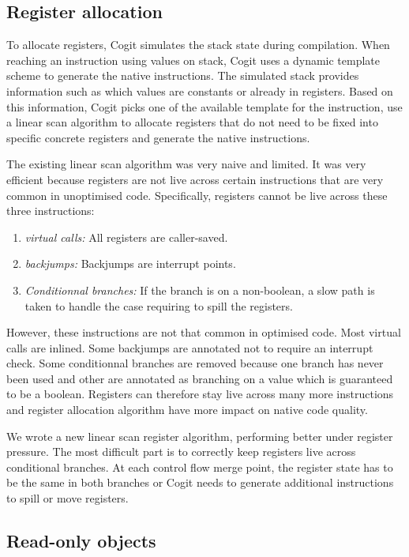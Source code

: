 \documentclass[a4paper,12pt,twoside]{../includes/ThesisStyle}
\begin{document}
\subsection{Register allocation}

To allocate registers, Cogit simulates the stack state during compilation. When reaching an instruction using values on stack, Cogit uses a dynamic template scheme to generate the native instructions. The simulated stack provides information such as which values are constants or already in registers. Based on this information, Cogit picks one of the available template for the instruction, use a linear scan algorithm to allocate registers that do not need to be fixed into specific concrete registers and generate the native instructions.

The existing linear scan algorithm was very naive and limited. It was very efficient because registers are not live across certain instructions that are very common in unoptimised code. Specifically, registers cannot be live across these three instructions:
\begin{enumerate}
	\item \emph{virtual calls:} All registers are caller-saved.
	\item \emph{backjumps:} Backjumps are interrupt points.
	\item \emph{Conditionnal branches:} If the branch is on a non-boolean, a slow path is taken to handle the case requiring to spill the registers.
\end{enumerate}

However, these instructions are not that common in optimised code. Most virtual calls are inlined. Some backjumps are annotated not to require an interrupt check. Some conditionnal branches are removed because one branch has never been used and other are annotated as branching on a value which is guaranteed to be a boolean. Registers can therefore stay live across many more instructions and register allocation algorithm have more impact on native code quality.

We wrote a new linear scan register algorithm, performing better under register pressure. The most difficult part is to correctly keep registers live across conditional branches. At each control flow merge point, the register state has to be the same in both branches or Cogit needs to generate additional instructions to spill or move registers.

\subsection{Read-only objects}
\end{document}
